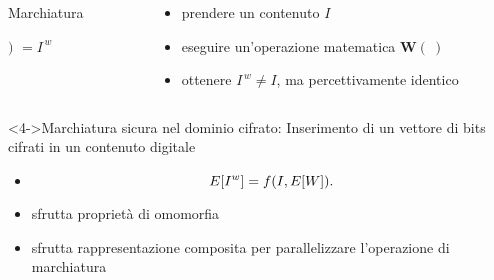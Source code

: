 \begin{frame}
\begin{columns}[c]
\begin{column}{0.5\textwidth}
\begin{block}{Marchiatura}
\begin{center}
\Large  {}  $)$ $=\textit{I}^{\, \textit{w}}$
\end{center}
\end{block}
\end{column}
\begin{column}{0.5\textwidth}
\begin{itemize}
\item {} prendere un contenuto $I$
\item {} eseguire un'operazione matematica $ \textbf{W}(\:) $
\item {} ottenere $\textit{I}^{\, \textit{w}} \neq \textit{I}$, \alert{ma percettivamente identico}
\end{itemize}
\end{column}
\end{columns}
\vspace{10pt}
\begin{block}<4->{Marchiatura sicura nel dominio cifrato:}
Inserimento di un vettore di bits cifrati in un contenuto digitale
\begin{itemize}
\item<4-> \begin{equation*}
\Large E[I^{w}] = f(I,E[W]).
\end{equation*}
\item<5-> sfrutta proprietà di omomorfia
\item<6-> sfrutta rappresentazione composita per parallelizzare l'operazione di marchiatura 
\end{itemize}
\end{block}
\end{frame}

